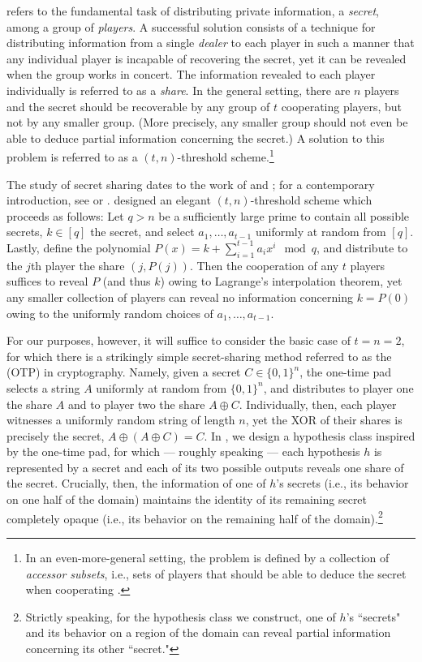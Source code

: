  refers to the fundamental task of distributing private information, a \emph{secret}, among a group of \emph{players}. A successful solution consists of a technique for distributing information from a single \emph{dealer} to each player in such a manner that any individual player is incapable of recovering the secret, yet it can be revealed when the group works in concert. The information revealed to each player individually is referred to as a \emph{share}. In the general setting, there are $n$ players and the secret should be recoverable by any group of $t$ cooperating players, but not by any smaller group. (More precisely, any smaller group should not even be able to deduce partial information concerning the secret.) A solution to this problem is referred to as a $(t, n)$-threshold scheme.\footnote{In an even-more-general setting, the problem is defined by a collection of \emph{accessor subsets}, i.e., sets of players that should be able to deduce the secret when cooperating \citep{ito1989secret}.}

The study of secret sharing dates to the work of \citet{shamir1979share} and \citet{blakley1979safeguarding}; for a contemporary introduction, see \citet{beimel2011secret} or \citet{krenn2023introduction}. \citet{shamir1979share} designed an elegant $(t, n)$-threshold scheme which proceeds as follows: Let $q > n$ be a sufficiently large prime to contain all possible secrets, $k \in [q]$ the secret, and select $a_1, \ldots, a_{t-1}$ uniformly at random from $[q]$. Lastly, define the polynomial $P(x) = k + \sum_{i=1}^{t-1} a_i x^i \mod q$, and distribute to the $j$th player the share $(j, P(j))$. Then the cooperation of any $t$ players suffices to reveal $P$ (and thus $k$) owing to Lagrange's interpolation theorem, yet any smaller collection of players can reveal no information concerning $k = P(0)$ owing to the uniformly random choices of $a_1, \ldots, a_{t-1}$. 

For our purposes, however, it will suffice to consider the basic case of $t = n = 2$, for which there is a strikingly simple secret-sharing method referred to as the  (OTP) in cryptography. Namely, given a secret $C \in \{0, 1\}^n$, the one-time pad selects a string $A$ uniformly at random from $\{0, 1\}^n$, and distributes to player one the share $A$ and to player two the share $A \oplus C$. Individually, then, each player witnesses a uniformly random string of length $n$, yet the XOR of their shares is precisely the secret, $A \oplus (A \oplus C) = C$. In , we design a hypothesis class inspired by the one-time pad, for which --- roughly speaking --- each hypothesis $h$ is represented by a secret and each of its two possible outputs reveals one share of the secret. Crucially, then, the information of one of $h$'s secrets (i.e., its behavior on one half of the domain) maintains the identity of its remaining secret completely opaque (i.e., its behavior on the remaining half of the domain).\footnote{Strictly speaking, for the hypothesis class we construct, one of $h$'s ``secrets" and its behavior on a region of the domain can reveal partial information concerning its other ``secret."}

